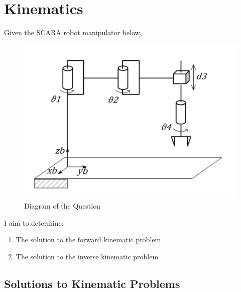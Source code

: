 \documentclass[12pt]{report}
\begin{document}
	
\tableofcontents %
\listoffigures

	\chapter{Kinematics}
	
Given the SCARA robot manipulator below,\\ 
	\begin{figure}[H]
		\centering
		\includegraphics[scale = 1.25]{question} %
		\caption{Diagram of the Question}
		\label{fig:q} %
	\end{figure}

I aim to determine: 
	\begin{enumerate}
		\item The solution to the forward kinematic problem 
		\item The solution to the inverse kinematic problem
		 
	\end{enumerate}
\newpage
\section{Solutions to Kinematic Problems}
\end{document}
